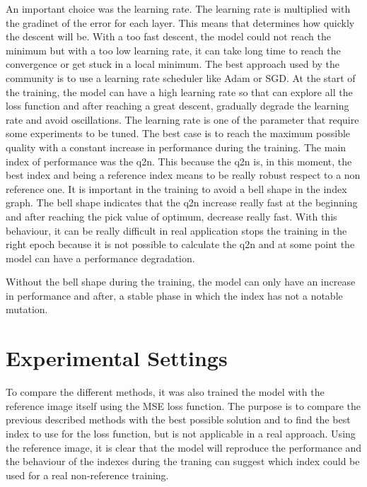 \documentclass[12pt]{report}
\begin{document}
An important choice was the learning rate. The learning rate is multiplied with the gradinet of the error for each layer.
This means that determines how quickly the descent will be. With a too fast descent, the model could not reach the minimum
but with a too low learning rate, it can take long time to reach the convergence or get stuck in a local minimum.
The best approach used by the community is to use a learning rate scheduler like Adam or SGD.
At the start of the training, the model can have a high learning rate so that can explore all the loss function and after 
reaching a great descent, gradually degrade the learning rate and avoid oscillations.
The learning rate is one of the parameter that require some experiments to be tuned.
The best case is to reach the maximum possible quality with a constant increase in performance during the training.
The main index of performance was the q2n. This because the q2n is, in this moment, the best index and being a reference index means to be really robust respect to 
a non reference one. 
It is important in the training to avoid a bell shape in the index graph. The bell shape indicates that the q2n increase really fast at the beginning and
after reaching the pick value of optimum, decrease really fast. 
With this behaviour, it can be really difficult in real application stops the training in the right epoch because
it is not possible to calculate the q2n and at some point the model can have a performance degradation.

Without the bell shape during the training, the model can only have an increase in performance and after, a stable phase in which the index has not a notable mutation.


\section{Experimental Settings}
To compare the different methods, it was also trained the model with the reference image itself using the MSE loss function.
The purpose is to compare the previous described methods with the best possible solution and to find the best index to use for the loss function, but is not applicable in a real approach.
Using the reference image, it is clear that the model will reproduce the performance and the
behaviour of the indexes during the traning can suggest which index could be used for a real non-reference training.
\end{document}
